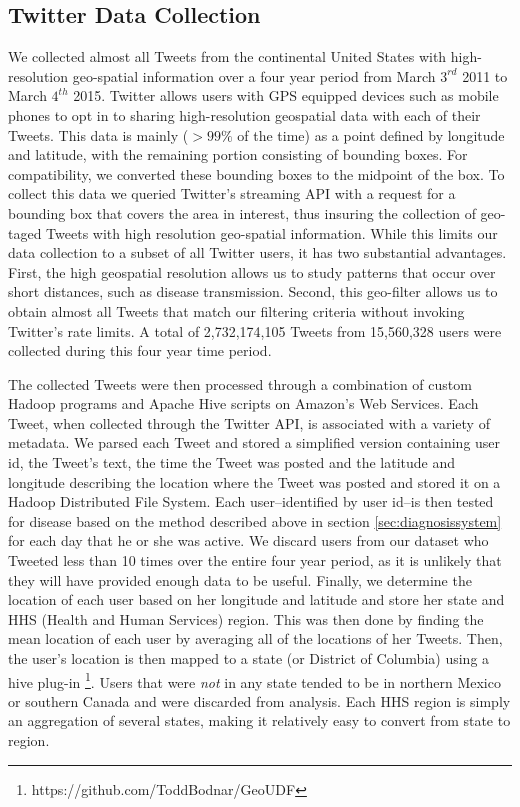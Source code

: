 

\subsection{Twitter Data Collection}
\label{subsec:datacollection}
We collected almost all Tweets from the continental United States with high-resolution geo-spatial information over a four year period from March \(3^{rd}\) 2011 to March \(4^{th}\) 2015. Twitter allows users with GPS equipped devices such as mobile phones to opt in to sharing high-resolution geospatial data with each of their Tweets. This data is mainly (\(> 99\%\) of the time) as a point defined by longitude and latitude, with the remaining portion consisting of bounding boxes. For compatibility, we converted these bounding boxes to the midpoint of the box. To collect this data we queried Twitter's streaming API with a request for a bounding box that covers the area in interest, thus insuring the collection of geo-taged Tweets with high resolution geo-spatial information. While this limits our data collection to a subset of all Twitter users, it has two substantial advantages. First, the high geospatial resolution allows us to study patterns that occur over short distances, such as disease transmission. Second, this geo-filter allows us to obtain almost all Tweets that match our filtering criteria without invoking Twitter's rate limits.\cite{morstatter2013sample} A total of 2,732,174,105 Tweets from 15,560,328 users were collected during this four year time period.

The collected Tweets were then processed through a combination of custom Hadoop programs and Apache Hive scripts on Amazon's Web Services. Each Tweet, when collected through the Twitter API, is associated with a variety of metadata. We parsed each Tweet and stored a simplified version containing user id, the Tweet's text, the time the Tweet was posted and the latitude and longitude describing the location where the Tweet was posted and stored it on a Hadoop Distributed File System. Each user--identified by user id--is then tested for disease based on the method described above in section \ref{sec:diagnosissystem} for each day that he or she was active. We discard users from our dataset who Tweeted less than 10 times over the entire four year period, as it is unlikely that they will have provided enough data to be useful. Finally, we determine the location of each user based on her longitude and latitude and store her state and HHS (Health and Human Services) region. This was then done by finding the mean location of each user by averaging all of the locations of her Tweets. Then, the user's location is then mapped to a state (or District of Columbia) using a hive plug-in \footnote{https://github.com/ToddBodnar/GeoUDF}. Users that were \emph{not} in any state tended to be in northern Mexico or southern Canada and were discarded from analysis. Each HHS region is simply an aggregation of several states, making it relatively easy to convert from state to region. 

